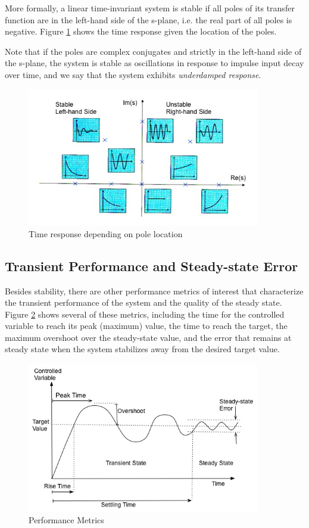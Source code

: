 \documentclass{article}
\begin{document}
More formally, a linear time-invariant system is stable if
all poles of its transfer function are in the left-hand side of the s-plane,
i.e. the real part of all poles is negative.
Figure \ref{fig:pole-loc} shows the time response given the location 
of the poles. 

Note that if the poles are complex conjugates and strictly in the left-hand side 
of the s-plane, the system is stable as oscillations in response to impulse input decay over time,
and we say that the system exhibits {\em underdamped response}.
\begin{figure}[htbp]
   \centering
   \includegraphics[width=4in]{figures/pole-loc.jpg} %
   \caption{Time response depending on pole location}
   \label{fig:pole-loc}
\end{figure}

\subsection{Transient Performance and Steady-state Error}
\label{sec:transient}

Besides stability, there are other performance metrics of interest that
characterize the transient performance of the system and the quality 
of the steady state.
Figure \ref{fig:transient} shows several of these metrics,
including the time for the controlled variable to reach its peak (maximum) value,
the time to reach the target, 
the maximum overshoot over the steady-state value,
and the error that remains at steady state
when the system stabilizes away from the desired target value.

\begin{figure}[htbp]
   \centering
   \includegraphics[width=4in]{figures/perf-spec.jpg} %
   \caption{Performance Metrics}
   \label{fig:transient}
\end{figure}
\end{document}
